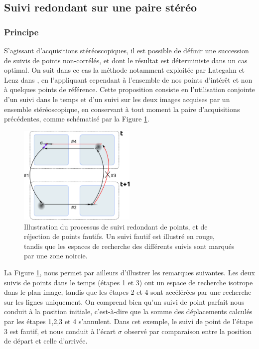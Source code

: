 \subsection{Suivi redondant sur une paire stéréo} \label{sec:ch3_Suivi redondant}
\subsubsection{Principe}
S'agissant d'acquisitions stéréoscopiques, il est possible de définir une succession de suivis de points non-corrélés, et dont le résultat est déterministe dans un cas optimal. On suit dans ce cas la méthode notamment exploitée par Lategahn et Lenz dans \cite{Lategahn2011, Lenz2011}, en l'appliquant cependant à l'ensemble de nos points d'intérêt et non à quelques points de référence. Cette proposition consiste en l'utilisation conjointe d'un suivi dans le temps et d'un suivi sur les deux images acquises par un ensemble stéréoscopique, en conservant à tout moment la paire d'acquisitions précédentes, comme schématisé par la Figure \ref{fig:ch3_4Frame}.\\

\begin{figure}[h]
	\begin{center}
		\includegraphics[width=0.5\textwidth]{Chapter3/graphics/4-Frames.png}
	\end{center}	
	\caption{Illustration du processus de suivi redondant de points, et de réjection de points fautifs. Un suivi fautif est illustré en rouge, tandis que les espaces de recherche des différents suivis sont marqués par une zone noircie.}
	\label{fig:ch3_4Frame}
\end{figure}

La Figure \ref{fig:ch3_4Frame}, nous permet par ailleurs d'illustrer les remarques suivantes. Les deux suivis de points dans le temps (étapes 1 et 3) ont un espace de recherche isotrope dans le plan image, tandis que les étapes 2 et 4 sont accélérées par une recherche sur les lignes uniquement. On comprend bien qu'un suivi de point parfait nous conduit à la position initiale, c'est-à-dire que la somme des déplacements calculés par les étapes 1,2,3 et 4 s'annulent. Dans cet exemple, le suivi de point de l'étape 3 est fautif, et nous conduit à l'écart $\sigma$ observé par comparaison entre la position de départ et celle d'arrivée.\\

